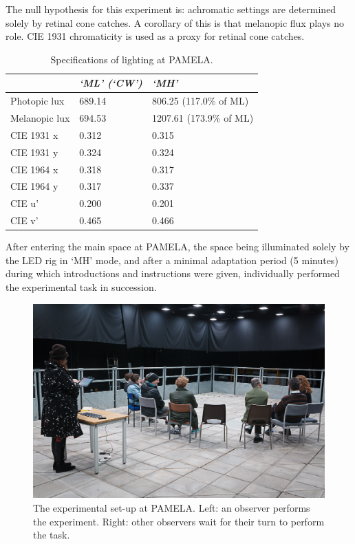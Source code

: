 The null hypothesis for this experiment is: achromatic settings are determined solely by retinal cone catches. A corollary of this is that melanopic flux plays no role. CIE 1931 chromaticity is used as a proxy for retinal cone catches.

\begin{table}[hbtp]

\begin{tabular}{|p{}|p{}|p{}|}
\hline
 & \emph{`ML' (`CW')} & \emph{`MH'} \\ \hline
Photopic lux & 689.14 & 806.25 (117.0\% of ML) \\ \hline
Melanopic lux & 694.53 & 1207.61 (173.9\% of ML) \\ \hline
CIE 1931 x & 0.312 & 0.315 \\ \hline
CIE 1931 y & 0.324 & 0.324 \\ \hline
CIE 1964 x & 0.318 & 0.317 \\ \hline
CIE 1964 y & 0.317 & 0.337 \\ \hline
CIE u' & 0.200 & 0.201 \\ \hline
CIE v' & 0.465 & 0.466 \\ \hline
\end{tabular}
\caption{Specifications of lighting at \gls{PAMELA}.}
\label{tab:PAMELAspecs}
\end{table}

After entering the main space at \gls{PAMELA}, the space being illuminated solely by the \gls{LED} rig in `MH' mode, and after a minimal adaptation period (5 minutes) during which introductions and instructions were given, individually performed the experimental task in succession. 

\begin{figure}[p]
\includegraphics[max width=\textwidth]{figs/tablet/PAMELAobs1.jpg} 
\caption{The experimental set-up at \acrshort{PAMELA}. Left: an observer performs the experiment. Right: other observers wait for their turn to perform the task.}
\label{fig:PAMELAobs1}
\end{figure}

